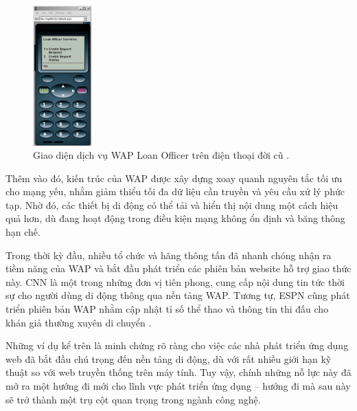 \begin{figure}[H]
  \centering
  \includegraphics[width=0.2\textwidth]{images/cc301785.mobilefig02(en-us,msdn.10).png}
  \caption{Giao diện dịch vụ WAP Loan Officer trên điện thoại đời cũ \cite{msdnLoanOfficer}.}
  \label{fig:fig10}
\end{figure}
  
  \begin{flushleft}
  \hspace*{0.8cm}Thêm vào đó, kiến trúc của WAP được xây dựng xoay quanh nguyên tắc tối ưu cho mạng yếu, nhằm giảm thiểu tối đa dữ liệu cần truyền và yêu cầu xử lý phức tạp. Nhờ đó, các thiết bị di động có thể tải và hiển thị nội dung một cách hiệu quả hơn, dù đang hoạt động trong điều kiện mạng không ổn định và băng thông hạn chế.
  \end{flushleft}
  
  \begin{flushleft}
  \hspace*{0.8cm}Trong thời kỳ đầu, nhiều tổ chức và hãng thông tấn đã nhanh chóng nhận ra tiềm năng của WAP và bắt đầu phát triển các phiên bản website hỗ trợ giao thức này. CNN là một trong những đơn vị tiên phong, cung cấp nội dung tin tức thời sự cho người dùng di động thông qua nền tảng WAP. Tương tự, ESPN cũng phát triển phiên bản WAP nhằm cập nhật tỉ số thể thao và thông tin thi đấu cho khán giả thường xuyên di chuyển \cite{cnn-espn-wap}.
  \end{flushleft}
  
  \begin{flushleft}
  \hspace*{0.8cm}Những ví dụ kể trên là minh chứng rõ ràng cho việc các nhà phát triển ứng dụng web đã bắt đầu chú trọng đến nền tảng di động, dù với rất nhiều giới hạn kỹ thuật so với web truyền thống trên máy tính. Tuy vậy, chính những nỗ lực này đã mở ra một hướng đi mới cho lĩnh vực phát triển ứng dụng – hướng đi mà sau này sẽ trở thành một trụ cột quan trọng trong ngành công nghệ.
  \end{flushleft}
  
